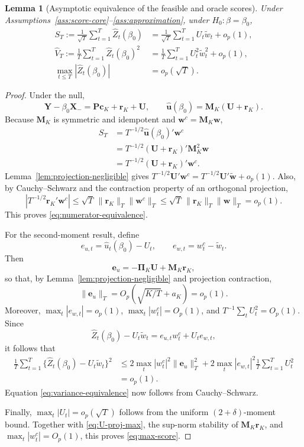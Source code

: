 \documentclass{article}
\newtheorem{lemma}{Lemma}
\begin{document}
\begin{lemma}[Asymptotic equivalence of the feasible and oracle scores]
\label{lem:score-equivalence}
Under Assumptions~\ref{ass:score-core}--\ref{ass:approximation}, under
\(H_0:\beta=\beta_0\),
\begin{align}
    S_T
      :=\frac1{\sqrt T}\sum_{t=1}^T\widehat Z_t(\beta_0)
      &=\frac1{\sqrt T}\sum_{t=1}^T U_t\widetilde w_t+o_p(1),             \label{eq:numerator-equivalence}\\
    \widehat V_T
      :=\frac1T\sum_{t=1}^T\widehat Z_t(\beta_0)^2
      &=\frac1T\sum_{t=1}^T U_t^2\widetilde w_t^2+o_p(1),                \label{eq:variance-equivalence}\\
    \max_{t\leq T}|\widehat Z_t(\beta_0)|&=o_p(\sqrt T).                \label{eq:max-score}
\end{align}
\end{lemma}

\begin{proof}
Under the null,
\[
    \bm Y-\beta_0\bm X_-
       =\bm P\bm c_K+\bm r_K+\bm U,
    \qquad
    \widehat{\bm u}(\beta_0)
       =\bm M_K(\bm U+\bm r_K).
\]
Because \(\bm M_K\) is symmetric and idempotent and
\(\bm w^c=\bm M_K\bm w\),
\begin{align*}
    S_T
      &=T^{-1/2}\widehat{\bm u}(\beta_0)'\bm w^c\\
      &=T^{-1/2}(\bm U+\bm r_K)'\bm M_K^2\bm w\\
      &=T^{-1/2}(\bm U+\bm r_K)'\bm w^c.
\end{align*}
Lemma~\ref{lem:projection-negligible} gives
\(T^{-1/2}\bm U'\bm w^c
  =T^{-1/2}\bm U'\widetilde{\bm w}+o_p(1)\).  Also, by Cauchy--Schwarz and
the contraction property of an orthogonal projection,
\[
    \left|T^{-1/2}\bm r_K'\bm w^c\right|
       \leq\sqrt T\,\|\bm r_K\|_T\|\bm w^c\|_T
       \leq\sqrt T\,\|\bm r_K\|_T\|\bm w\|_T
       =o_p(1).
\]
This proves \eqref{eq:numerator-equivalence}.

For the second-moment result, define
\[
    e_{u,t}=\widehat u_t(\beta_0)-U_t,
    \qquad
    e_{w,t}=w_t^c-\widetilde w_t.
\]
Then
\[
    \bm e_u=-\bm\Pi_K\bm U+\bm M_K\bm r_K,
\]
so that, by Lemma~\ref{lem:projection-negligible} and projection contraction,
\[
    \|\bm e_u\|_T
       =O_p\!\left(\sqrt{K/T}+a_K\right)=o_p(1).
\]
Moreover, \(\max_t|e_{w,t}|=o_p(1)\),
\(\max_t|w_t^c|=O_p(1)\), and \(T^{-1}\sum_tU_t^2=O_p(1)\).  Since
\[
    \widehat Z_t(\beta_0)-U_t\widetilde w_t
       =e_{u,t}w_t^c+U_te_{w,t},
\]
it follows that
\begin{align*}
    \frac1T\sum_{t=1}^T
       \{\widehat Z_t(\beta_0)-U_t\widetilde w_t\}^2
    &\leq
       2\max_t|w_t^c|^2\|\bm e_u\|_T^2
       +2\max_t|e_{w,t}|^2\frac1T\sum_{t=1}^TU_t^2\\
    &=o_p(1).
\end{align*}
Equation \eqref{eq:variance-equivalence} now follows from Cauchy--Schwarz.

Finally, \(\max_t|U_t|=o_p(\sqrt T)\) follows from the uniform
\((2+\delta)\)-moment bound.  Together with
\eqref{eq:U-proj-max}, the sup-norm stability of \(\bm M_K\bm r_K\), and
\(\max_t|w_t^c|=O_p(1)\), this proves \eqref{eq:max-score}.
\end{proof}
\end{document}
